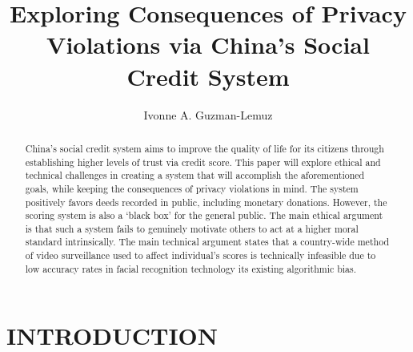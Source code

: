 \documentclass[letterpaper, 10 pt, conference]{ieeeconf}  %
\title{\LARGE \bf
Exploring Consequences of Privacy Violations via China's Social Credit System
}
\author{Ivonne A. Guzman-Lemuz}%
\begin{document}
\maketitle
\thispagestyle{empty}
\pagestyle{empty}


\begin{abstract}

China’s social credit system aims to improve the quality of life for its citizens through establishing higher levels of trust via credit score. This paper will explore ethical and technical challenges in creating a system that will accomplish the aforementioned goals, while keeping the consequences of privacy violations in mind. The system positively favors deeds recorded in public, including monetary donations. However, the scoring system is also a ‘black box’ for the general public. The main ethical argument is that such a system fails to genuinely motivate others to act at a higher moral standard intrinsically. The main technical argument states that a country-wide method of video surveillance used to affect individual’s scores is technically infeasible due to low accuracy rates in facial recognition technology its existing algorithmic bias.

\end{abstract}


\section{INTRODUCTION}
\end{document}
